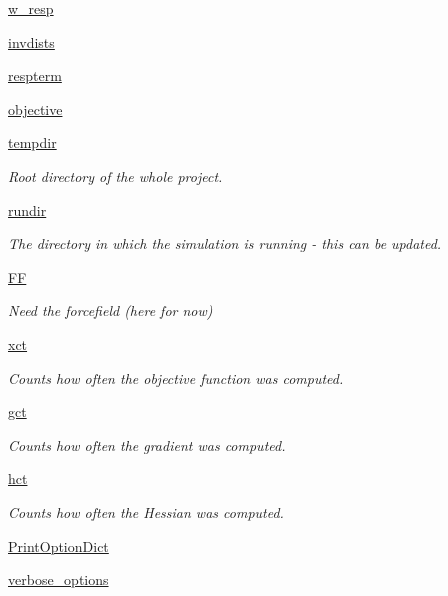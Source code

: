 \begin{DoxyCompactItemize}
\item 
\hyperlink{classforcebalance_1_1abinitio_1_1AbInitio_a176a442bd340d2f9b54319e76feb46ae}{w\-\_\-resp}
\item 
\hyperlink{classforcebalance_1_1abinitio_1_1AbInitio_aa01ee600ba0f429ffc81135af9d8109b}{invdists}
\item 
\hyperlink{classforcebalance_1_1abinitio_1_1AbInitio_a689e3849518b33539442a473a41ed32d}{respterm}
\item 
\hyperlink{classforcebalance_1_1abinitio_1_1AbInitio_acbbd447b9f66bc4699992f3b64bb256d}{objective}
\item 
\hyperlink{classforcebalance_1_1target_1_1Target_aa1f01b5b78db253b5b66384ed11ed193}{tempdir}
\begin{DoxyCompactList}\small\item\em Root directory of the whole project. \end{DoxyCompactList}\item 
\hyperlink{classforcebalance_1_1target_1_1Target_a6872de5b2d4273b82336ea5b0da29c9e}{rundir}
\begin{DoxyCompactList}\small\item\em The directory in which the simulation is running -\/ this can be updated. \end{DoxyCompactList}\item 
\hyperlink{classforcebalance_1_1target_1_1Target_a38a37919783141ea37fdcf8b00ce0aaf}{F\-F}
\begin{DoxyCompactList}\small\item\em Need the forcefield (here for now) \end{DoxyCompactList}\item 
\hyperlink{classforcebalance_1_1target_1_1Target_aad2e385cfbf7b4a68f1c2cb41133fe82}{xct}
\begin{DoxyCompactList}\small\item\em Counts how often the objective function was computed. \end{DoxyCompactList}\item 
\hyperlink{classforcebalance_1_1target_1_1Target_aa625ac88c6744eb14ef281d9496d0dbb}{gct}
\begin{DoxyCompactList}\small\item\em Counts how often the gradient was computed. \end{DoxyCompactList}\item 
\hyperlink{classforcebalance_1_1target_1_1Target_a5b5a42f78052b47f29ed4b940c6111a1}{hct}
\begin{DoxyCompactList}\small\item\em Counts how often the Hessian was computed. \end{DoxyCompactList}\item 
\hyperlink{classforcebalance_1_1BaseClass_afc6659278497d7245bc492ecf405ccae}{Print\-Option\-Dict}
\item 
\hyperlink{classforcebalance_1_1BaseClass_afd68efa29ccd2f320f4cf82198214aac}{verbose\-\_\-options}
\end{DoxyCompactItemize}



